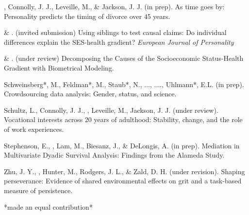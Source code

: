 
\item\meb, Connolly, J. J., Leveille, M., \& Jackson, J. J. (in prep). As time goes by: Personality predicts the timing of divorce over 45 years. %
\item \meb \& \joe. (invited submission) Using siblings to test causal claims: Do individual differences explain the SES-health gradient? \textit{European Journal of Personality}
\item \meb \& \joe.  (under review) Decomposing the Causes of the Socioeconomic Status-Health Gradient with Biometrical Modeling. %
\item Schweinsberg*, M., Feldman*, M., Staub*, N., ..., \meb ...., Uhlmann*, E.L. (in prep). Crowdsourcing data analysis: Gender, status, and science. 
\item Schultz, L., Connolly, J. J., \meb, Leveille, M., Jackson, J. J. (under review). Vocational interests across 20 years of adulthood: Stability, change, and the role of work experiences.%
\item Stephenson, E., \meb, Lam, M., Biesanz, J., \& DeLongis, A. (in prep). Mediation in Multivariate Dyadic Survival Analysis: Findings from the Alameda Study. %
\item Zhu, J. Y., \meb, Hunter, M., Rodgers, J. L., \& Zald, D. H. (under revision). Shaping perseverance: Evidence of shared environmental effects on grit and a task-based measure of persistence. %
\vspace{-2mm}\begin{center}\footnotesize{*made an equal contribution*}\end{center} \vspace{-3mm}
\vspace{-2mm}\begin{center}\end{center} \vspace{-4mm}